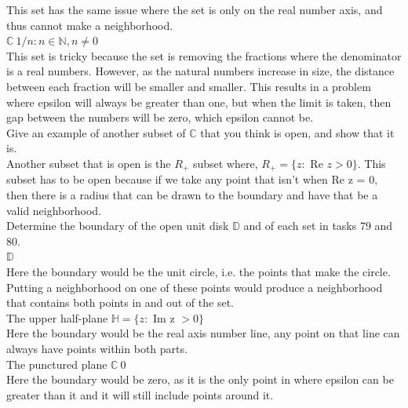 \documentclass[12pt]{article}
\begin{document}
This set has the same issue where the set is only on the real number axis, and thus cannot make a neighborhood.\\

 $\mathbb{C} \ {1/n : n \in \mathbb{N}, n \neq 0}$ \\
This set is tricky because the set is removing the fractions where the denominator is a real numbers.
However, as the natural numbers increase in size, the distance between each fraction will be smaller and smaller.
This results in a problem where epsilon will always be greater than one, but when the limit is taken, then gap between the numbers will be zero, which epsilon cannot be.\\


 Give an example of another subset of $\mathbb{C}$ that you think is open, and show that it is.\\

Another subset that is open is the $R_+$ subset where, $R_+ = \{z :$ Re $z > 0\}$. 
This subset has to be open because if we take any point that isn't when Re z = 0, then there is a radius that can be drawn to the boundary and have that be a valid neighborhood.\\


 Determine the boundary of the open unit disk $\mathbb{D}$ and of each set in tasks 79 and 80.\\

 $\mathbb{D}$\\

Here the boundary would be the unit circle, i.e. the points that make the circle.
Putting a neighborhood on one of these points would produce a neighborhood that contains both points in and out of the set.\\


 The upper half-plane $\mathbb{H} = \{z:$ Im z $ > 0\}$\\

Here the boundary would be the real axis number line, any point on that line can always have points within both parts.\\


 The punctured plane $\mathbb{C}\ {0}$ \\

Here the boundary would be zero, as it is the only point in where epsilon can be greater than it and it will still include points around it.\\
\end{document}
